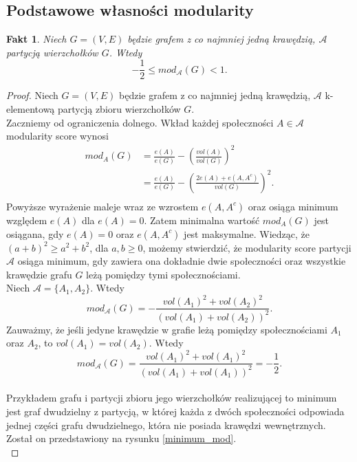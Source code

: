 \documentclass[letterpaper,12pt]{article}
\newtheorem{fact}{Fakt}
\begin{document}
\subsection{Podstawowe własności modularity} \label{własności}
\begin{fact} \cite[Lemma 3.1]{BD08}
  \label{score_bounds}
  Niech \(G = (V,E)\) będzie grafem z co najmniej jedną krawędzią, \(\mathcal{A}\) partycją wierzchołków \(G\). Wtedy
  \[-\frac{1}{2} \leq mod_{\mathcal{A}}(G) < 1.\]
\end{fact}
\begin{proof}
  Niech \(G = (V,E)\) będzie grafem z co najmniej jedną krawędzią, \(\mathcal{A}\) k-elementową partycją zbioru wierzchołków \(G\).\\

  Zaczniemy od ograniczenia dolnego. Wkład każdej społeczności \(A \in \mathcal{A}\) modularity score wynosi
  \begin{align*}
    mod_A(G) & = \frac{e(A)}{e(G)} - {\left(\frac{vol(A)}{vol(G)}\right)}^2          \\
             & = \frac{e(A)}{e(G)} - {\left(\frac{2e(A)+e(A,A^c)}{vol(G)}\right)}^2. \\
  \end{align*}
  Powyższe wyrażenie maleje wraz ze wzrostem \(e(A, A^c)\) oraz osiąga minimum względem \(e(A)\) dla \(e(A) = 0\). Zatem minimalna wartość \(mod_A(G)\) jest osiągana, gdy \(e(A) = 0\) oraz \(e(A, A^c)\) jest maksymalne. Wiedząc, że \((a+b)^2 \geq a^2+b^2\), dla \(a,b \geq 0\), możemy stwierdzić, że modularity score partycji \(\mathcal{A}\) osiąga minimum, gdy zawiera ona dokładnie dwie społeczności oraz wszystkie krawędzie grafu \(G\) leżą pomiędzy tymi społecznościami.\\

  Niech \(\mathcal{A}=\{A_1,A_2\}\). Wtedy
  \[mod_{\mathcal{A}}(G) = -\frac{vol(A_1)^2+vol(A_2)^2}{(vol(A_1)+vol(A_2))^2}.\]
  Zauważmy, że jeśli jedyne krawędzie w grafie leżą pomiędzy społecznościami \(A_1\) oraz \(A_2\), to \(vol(A_1)=vol(A_2)\). Wtedy
  \[mod_{\mathcal{A}}(G) = \frac{vol(A_1)^2+vol(A_1)^2}{(vol(A_1)+vol(A_1))^2} = -\frac{1}{2}.\]\\
  Przykładem grafu i partycji zbioru jego wierzchołków realizującej to minimum jest graf dwudzielny z partycją, w której każda z dwóch społeczności odpowiada jednej części grafu dwudzielnego, która nie posiada krawędzi wewnętrznych. Został on przedstawiony na rysunku \ref{minimum_mod}.\\


\end{proof}
\end{document}

